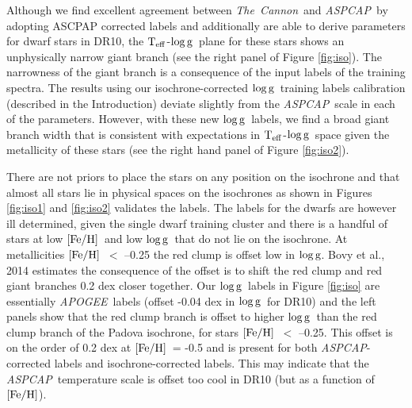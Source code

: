 \documentclass[12pt, preprint]{aastex}
\newcommand{\teff}{\mbox{$\rm T_{eff}$}}
\newcommand{\feh}{\mbox{$\rm [Fe/H]$}}
\newcommand{\logg}{\mbox{$\rm \log g$}}
\newcommand{\tc}{\textsl{The~Cannon}}
\newcommand{\apogee}{\textsl{APOGEE}}
\newcommand{\aspcap}{\textsl{ASPCAP}}
\begin{document}
Although we find excellent agreement between \tc\ and \aspcap\ by adopting ASCPAP corrected labels and additionally are able to derive parameters for dwarf stars in DR10, the \teff-\logg\ plane for these stars shows an unphysically narrow giant branch  (see the right panel of Figure \ref{fig:iso}). The narrowness of the giant branch is a consequence of the input labels of the training spectra. The results using our isochrone-corrected \logg\ training labels calibration (described in the Introduction) deviate slightly   from the \aspcap\ scale in each of the parameters. However, with these new \logg\ labels, we find a broad giant branch width that is consistent with expectations in \teff-\logg\ space given the metallicity of these stars (see the right hand panel of Figure \ref{fig:iso2}). 

There are not priors to place the stars on any position on the isochrone and that almost all stars lie in physical spaces on the isochrones as shown in Figures \ref{fig:iso1} and \ref{fig:iso2} validates the labels. The labels for the dwarfs are however ill determined, given the single dwarf training cluster and there is a handful of stars at low \feh\ and low \logg\ that do not lie on the isochrone. At metallicities \feh\ $<$ --0.25 the red clump is offset low in \logg. Bovy et al., 2014 estimates the consequence of the offset is to shift the red clump and red giant branches 0.2 dex closer together. Our \logg\ labels in Figure \ref{fig:iso} are essentially \apogee\ labels (offset -0.04 dex in \logg\ for DR10) and the left panels show that the red clump branch is offset to higher \logg\ than the red clump branch of the Padova isochrone, for stars \feh\ $<$ --0.25. This offset is on the order of 0.2 dex at \feh\ = -0.5 and is present for both \aspcap-corrected  labels and isochrone-corrected labels. This may indicate that the \aspcap\ temperature scale is offset too cool in DR10 (but as a function of \feh).

\end{document}
